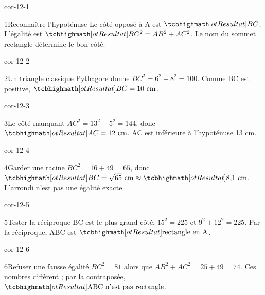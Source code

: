 \clearpage\pagestyle{otMain}\fontsize{11}{15}\selectfont{}
\begin{blocLivre}{cor-12-1}\begin{corrige}{1}{Reconnaître l’hypoténuse}
Le côté opposé à A est $\res{BC}$. L’égalité est $\res{BC^2=AB^2+AC^2}$. Le nom du sommet rectangle détermine le bon côté.
\label{fig-cor-12-1}
\end{corrige}\end{blocLivre}
\begin{blocLivre}{cor-12-2}\begin{corrige}{2}{Un triangle classique}
Pythagore donne $BC^2=6^2+8^2=100$. Comme BC est positive, $\res{BC=10\text{ cm}}$.
\label{fig-cor-12-2}
\end{corrige}\end{blocLivre}
\begin{blocLivre}{cor-12-3}\begin{corrige}{3}{Le côté manquant}
$AC^2=13^2-5^2=144$, donc $\res{AC=12\text{ cm}}$. AC est inférieure à l’hypoténuse 13 cm.
\label{fig-cor-12-3}
\end{corrige}\end{blocLivre}
\begin{blocLivre}{cor-12-4}\begin{corrige}{4}{Garder une racine}
$BC^2=16+49=65$, donc $\res{BC=\sqrt{65}\text{ cm}}\approx\res{8{,}1\text{ cm}}$. L’arrondi n’est pas une égalité exacte.
\label{fig-cor-12-4}
\end{corrige}\end{blocLivre}
\begin{blocLivre}{cor-12-5}\begin{corrige}{5}{Tester la réciproque}
BC est le plus grand côté. $15^2=225$ et $9^2+12^2=225$. Par la réciproque, ABC est $\res{\text{rectangle en A}}$.
\label{fig-cor-12-5}
\end{corrige}\end{blocLivre}
\begin{blocLivre}{cor-12-6}\begin{corrige}{6}{Refuser une fausse égalité}
$BC^2=81$ alors que $AB^2+AC^2=25+49=74$. Ces nombres diffèrent ; par la contraposée, $\res{\text{ABC n’est pas rectangle}}$.
\label{fig-cor-12-6}
\end{corrige}\end{blocLivre}
